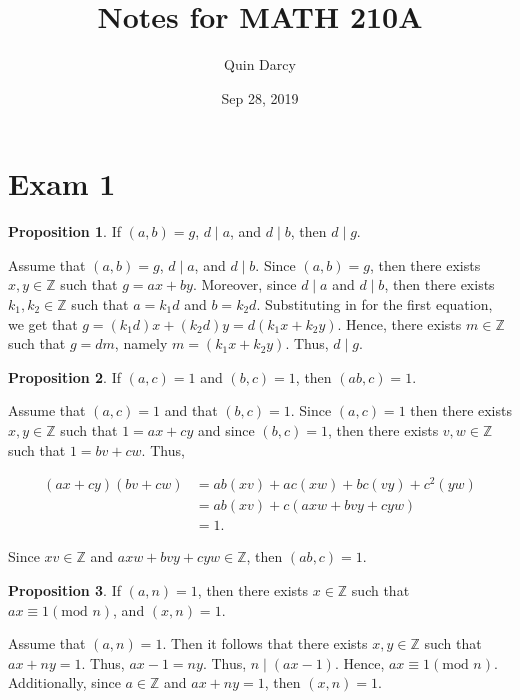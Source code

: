 \documentclass{article}
\makeatletter
\theoremstyle{definition}
\newtheorem{prop}{Proposition}[section]
\theoremstyle{remark}
\let\oldproofname=\proofname
\renewcommand{\proofname}{\bf{\textit{\oldproofname}}}
\theoremstyle{definition}
\renewenvironment{proof}[1][\proofname]{\par
  \pushQED{\qed}%
  \normalfont \topsep6\p@\@plus6\p@\relax
  \list{}{\leftmargin=0mm
          \rightmargin=0mm
          \settowidth{\itemindent}{\itshape#1}%
          \labelwidth=4mm
          \parsep=0pt \listparindent=0mm%
  }
  \item[\hskip\labelsep
        \itshape
    #1\@addpunct{.}]\ignorespaces
}{%
  \popQED\endlist\@endpefalse
}
\makeatother
\begin{document}
\title{Notes for MATH 210A}
\author{Quin Darcy}
\date{Sep 28, 2019}
\maketitle

\section{Exam 1}
    \begin{prop}\label{prop:1.1}
        If $(a,b)=g$, $d\mid a$, and $d\mid b$, then $d\mid g$.
    \end{prop}
        \begin{proof}
            Assume that $(a,b)=g$, $d\mid a$, and $d\mid b$. Since $(a,b)=g$, then there exists $x,y\in\mathbb{Z}$ such that $g=ax+by$. Moreover, since $d\mid a$ and $d\mid b$, then there exists $k_1,k_2\in\mathbb{Z}$ such that $a=k_1d$ and $b=k_2d$. Substituting in for the first equation, we get that $g=(k_1d)x+(k_2d)y=d(k_1x+k_2y)$. Hence, there exists $m\in\mathbb{Z}$ such that $g=dm$, namely $m=(k_1x+k_2y)$. Thus, $d\mid g$.
        \end{proof}
    \begin{prop}\label{prop:1.2}
        If $(a,c)=1$ and $(b,c)=1$, then $(ab,c)=1$.
    \end{prop}
        \begin{proof}
            Assume that $(a,c)=1$ and that $(b,c)=1$. Since $(a,c)=1$ then there exists $x,y\in\mathbb{Z}$ such that $1=ax+cy$ and since $(b,c)=1$, then there exists $v,w\in\mathbb{Z}$ such that $1=bv+cw$. Thus,
        
            \begin{equation*}
                \begin{split}
                    (ax+cy)(bv+cw) &= ab(xv)+ac(xw)+bc(vy)+c^2(yw) \\
                    &=ab(xv)+c(axw+bvy+cyw) \\
                    &= 1.
                \end{split}
            \end{equation*}
        
            Since $xv\in\mathbb{Z}$ and $axw+bvy+cyw\in\mathbb{Z}$, then $(ab,c)=1$.
        \end{proof}
    \begin{prop}\label{prop:1.3}
        If $(a,n)=1$, then there exists $x\in\mathbb{Z}$ such that   $ax\equiv 1(\text{mod }n)$, and $(x,n)=1$.
    \end{prop}
        \begin{proof}
            Assume that $(a,n)=1$. Then it follows that there exists $x,y\in\mathbb{Z}$ such that $ax+ny=1$. Thus, $ax-1=ny$. Thus, $n\mid(ax-1)$. Hence, $ax\equiv 1(\text{mod }n)$. Additionally, since $a\in\mathbb{Z}$ and $ax+ny=1$, then $(x,n)=1$.
        \end{proof}
\end{document}
